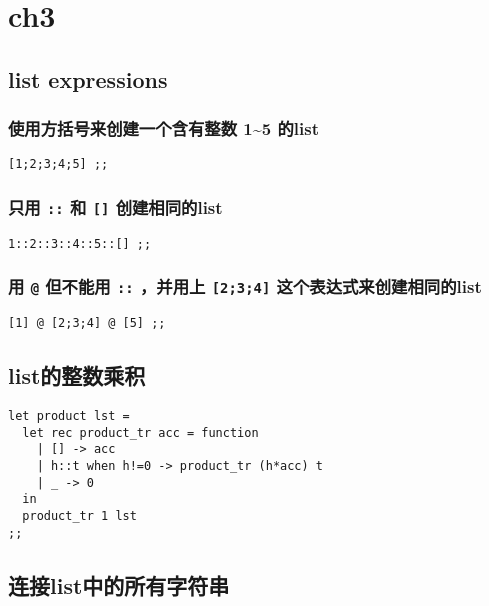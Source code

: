 \documentclass[11pt]{article}
\date{\today}
\title{}
\begin{document}
\tableofcontents

\section{ch3}
\label{sec:orgcf5ccda}

\subsection{list expressions}
\label{sec:org8d5e3d7}

\subsubsection{使用方括号来创建一个含有整数 1\textasciitilde{}5 的list}
\label{sec:orge39f541}
\begin{verbatim}
[1;2;3;4;5] ;;
\end{verbatim}

\subsubsection{只用 \texttt{::} 和 \texttt{[]} 创建相同的list}
\label{sec:orgf84ca58}
\begin{verbatim}
1::2::3::4::5::[] ;;
\end{verbatim}

\subsubsection{用 \texttt{@} 但不能用 \texttt{::} ，并用上 \texttt{[2;3;4]} 这个表达式来创建相同的list}
\label{sec:orgd76791d}
\begin{verbatim}
[1] @ [2;3;4] @ [5] ;;
\end{verbatim}

\subsection{list的整数乘积}
\label{sec:org33b0a55}
\begin{verbatim}
let product lst =
  let rec product_tr acc = function 
    | [] -> acc 
    | h::t when h!=0 -> product_tr (h*acc) t
    | _ -> 0 
  in
  product_tr 1 lst
;;
\end{verbatim}

\subsection{连接list中的所有字符串}
\label{sec:orgb6874fb}
\end{document}
